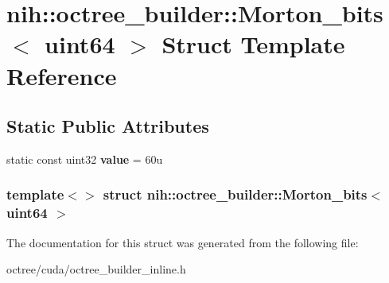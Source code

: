 \hypertarget{structnih_1_1octree__builder_1_1_morton__bits_3_01uint64_01_4}{
\section{nih\-:\-:octree\-\_\-builder\-:\-:\-Morton\-\_\-bits$<$ uint64 $>$ \-Struct \-Template \-Reference}
\label{structnih_1_1octree__builder_1_1_morton__bits_3_01uint64_01_4}
}
\subsection*{\-Static \-Public \-Attributes}
\begin{DoxyCompactItemize}
\item 
\hypertarget{structnih_1_1octree__builder_1_1_morton__bits_3_01uint64_01_4_a5c109817d5686c1599287b0037fa81fb}{
static const uint32 {\bfseries value} = 60u}
\label{structnih_1_1octree__builder_1_1_morton__bits_3_01uint64_01_4_a5c109817d5686c1599287b0037fa81fb}

\end{DoxyCompactItemize}
\subsubsection*{template$<$$>$ struct nih\-::octree\-\_\-builder\-::\-Morton\-\_\-bits$<$ uint64 $>$}



\-The documentation for this struct was generated from the following file\-:\begin{DoxyCompactItemize}
\item 
octree/cuda/octree\-\_\-builder\-\_\-inline.\-h\end{DoxyCompactItemize}
